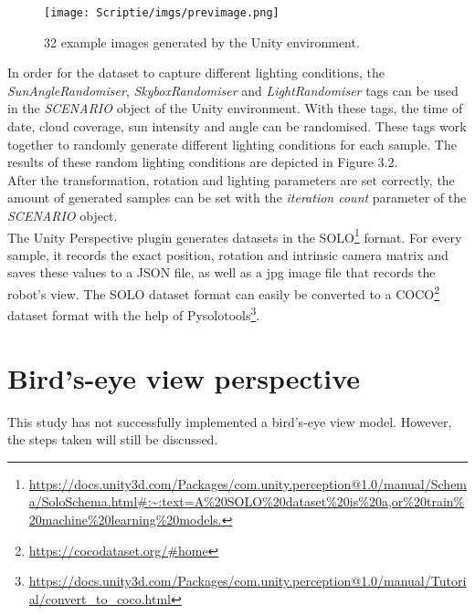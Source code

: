 \documentclass{uva-inf-bachelor-thesis}
\begin{document}
        \begin{figure}[H]
        \centering
        \texttt{[image: Scriptie/imgs/previmage.png]}
        \caption{32 example images generated by the Unity environment.}
        \end{figure}

        In order for the dataset to capture different lighting conditions, the \textit{SunAngleRandomiser}, \textit{SkyboxRandomiser} and \textit{LightRandomiser} tags can be used in the \textit{SCENARIO} object of the Unity environment. With these tags, the time of date, cloud coverage, sun intensity and angle can be randomised. These tags work together to randomly generate different lighting conditions for each sample. The results of these random lighting conditions are depicted in Figure 3.2. \\
        After the transformation, rotation and lighting parameters are set correctly, the amount of generated samples can be set with the \textit{iteration count} parameter of the \textit{SCENARIO} object.
        \hfill \break \\
        The Unity Perspective plugin generates datasets in the SOLO\footnote{\url{https://docs.unity3d.com/Packages/com.unity.perception@1.0/manual/Schema/SoloSchema.html\#:\~:text=A\%20SOLO\%20dataset\%20is\%20a,or\%20train\%20machine\%20learning\%20models.}} format. For every sample, it records the exact position, rotation and intrinsic camera matrix and saves these values to a JSON file, as well as a jpg image file that records the robot's view. The SOLO dataset format can easily be converted to a COCO\footnote{\url{https://cocodataset.org/\#home}} dataset format with the help of Pysolotools\footnote{\url{https://docs.unity3d.com/Packages/com.unity.perception@1.0/manual/Tutorial/convert_to_coco.html}}.
        


    \section{Bird's-eye view perspective}
        This study has not successfully implemented a bird's-eye view model. However, the steps taken will still be discussed. 
\end{document}
